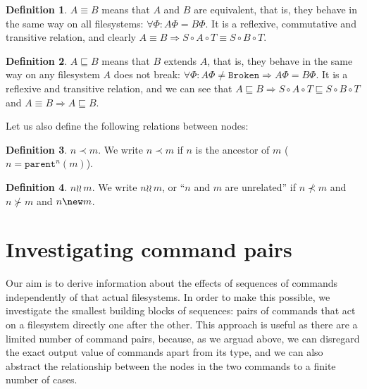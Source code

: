 \documentclass[12pt]{article}
\newcommand{\parent}{\mathtt{parent}}
\newcommand{\fsbroken}{\mathtt{Broken}} %
\newcommand{\FS}{\Phi} %
\newcommand{\cc}{\circ} %
\newcommand{\descendant}{\prec}
\newcommand{\ancestor}{\succ}
\newcommand{\eqext}{\sqsubseteq}
\newcommand{\indep}{\wr\!\!\wr\,} %
\newcommand{\unrel}{\indep} %
\theoremstyle{definition}
\newtheorem{mydef}{Definition}
\begin{document}
\begin{mydef}
$A\equiv B$ means that $A$ and $B$ are equivalent,
that is, they behave in the same way on
all filesystems: $\forall \FS: A\FS=B\FS$.
It is a reflexive, commutative and transitive relation,
and clearly
$ A\equiv B \Rightarrow S\cc A\cc T\equiv S\cc B\cc T $.
\end{mydef}

\begin{mydef}
$A\eqext B$ means that $B$ extends $A$,
that is, they behave in the same way
on any filesystem $A$ does not break:
$\forall \FS: A\FS\neq\fsbroken\Rightarrow A\FS=B\FS$.
It is a reflexive and transitive relation,
and we can see that
$ A\eqext B \Rightarrow S\cc A\cc T\eqext S\cc B\cc T$
and
$ A\equiv B \Rightarrow A\eqext B$.
\end{mydef}

Let us also define the following relations between nodes:

\begin{mydef}{$n\descendant m$.}
We write $n\descendant m$ if $n$ is the ancestor of $m$ ($n=\parent^n(m)$). %
\end{mydef}

\begin{mydef}{$n\unrel m$.}
We write $n\unrel m$, or ``$n$ and $m$ are unrelated'' if $n\not\descendant m$ and $n\not\ancestor m$
and $n\new m$.
\end{mydef}



\section{Investigating command pairs}

Our aim is to derive information about the effects of sequences
of commands independently of that actual filesystems.
In order to make this possible, we investigate the smallest building
blocks of sequences: pairs of commands that act on a filesystem directly one after the other.
This approach is useful as there are a limited number of command pairs,
because, as we arguad above, we can disregard the exact output value of commands apart from its type,
and we can also abstract the relationship between the nodes in the two commands
to a finite number of cases.
\end{document}
